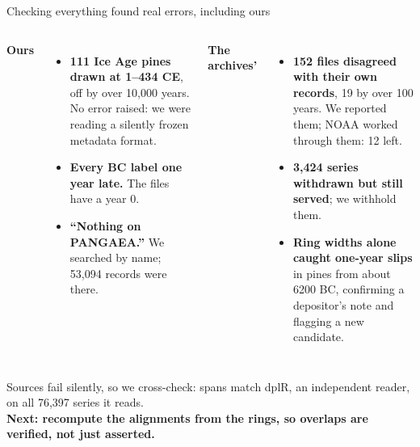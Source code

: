 \documentclass[aspectratio=169]{beamer}
\begin{document}
\begin{frame}{Checking everything found real errors, including ours}
\vspace{-0.5em}
\begin{columns}[T]
\textbf{Ours}
\begin{itemize}\footnotesize
\item \textbf{111 Ice Age pines drawn at 1--434 CE}, off by over 10,000 years. No error raised:
we were reading a silently frozen metadata format.
\item \textbf{Every BC label one year late.} The files have a year 0.
\item \textbf{``Nothing on PANGAEA.''} We searched by name; 53,094 records were there.
\end{itemize}
\textbf{The archives'}
\begin{itemize}\footnotesize
\item \textbf{152 files disagreed with their own records}, 19 by over 100 years.
We reported them; NOAA worked through them: 12 left.
\item \textbf{3,424 series withdrawn but still served}; we withhold them.
\item \textbf{Ring widths alone caught one-year slips} in pines from about 6200 BC,
confirming a depositor's note and flagging a new candidate.
\end{itemize}
\end{columns}

\vspace{0.2em}
\begin{block}{}
\centering\footnotesize
Sources fail silently, so we cross-check: spans match dplR, an independent reader,
on all 76,397 series it reads.\\
\textbf{Next: recompute the alignments from the rings, so overlaps are verified, not just asserted.}
\end{block}
\end{frame}
\end{document}

